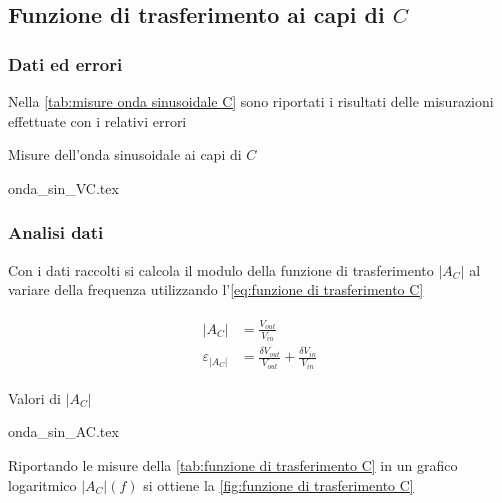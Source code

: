 \documentclass[11pt, a4paper]{article}
\numberwithin{equation}{section} %
\begin{document}
\subsection{Funzione di trasferimento ai capi di $C$}

\subsubsection{Dati ed errori}

Nella \autoref{tab:misure onda sinusoidale C} sono riportati i risultati delle misurazioni effettuate con i relativi errori

\begin{table}[ht!]
    \centering
    \caption{Misure dell'onda sinusoidale ai capi di $C$}
    {onda_sin_VC.tex}
    \label{tab:misure onda sinusoidale C}
\end{table}

\newpage

\subsubsection{Analisi dati}

Con i dati raccolti si calcola il modulo della funzione di trasferimento $|A_{C}|$ al variare della frequenza utilizzando l'\autoref{eq:funzione di trasferimento C}

\begin{align} \label{eq:funzione di trasferimento C}
    \begin{split}
        |A_{C}| &= \frac{V_{out}}{V_{in}} \\
        \varepsilon_{|A_{C}|} &= \frac{\delta V_{out}}{V_{out}} + \frac{\delta V_{in}}{V_{in}}
    \end{split}
\end{align}

\begin{table}[ht!]
    \centering
    \caption{Valori di $|A_{C}|$}
    {onda_sin_AC.tex}
    \label{tab:funzione di trasferimento C}
\end{table}

Riportando le misure della \autoref{tab:funzione di trasferimento C} in un grafico logaritmico $|A_{C}|(f)$ si ottiene la \autoref{fig:funzione di trasferimento C}
\end{document}
